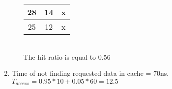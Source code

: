\documentclass[12pt]{article}
\begin{document}
\begin{enumerate}
\begin{enumerate}
\begin{table}[h!]
\begin{tabular}{|c|c|c|}
                        28 &14&x\\ \hline
                        25 &12&x\\ \hline
                \end{tabular}
            \end{table}
            \\ The hit ratio is equal to 0.56
        \end{enumerate}
    \item \mbox{}
        Time of not finding requested data in cache = 70ns.\\
        $T_{access}=0.95*10+0.05*60=12.5$
\end{enumerate}
\end{document}
